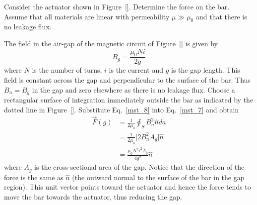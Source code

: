 \documentclass[12pt,a4paper,oneside]{book}
\begin{document}
\begin{onehalfspace}
\begin{example}
Consider the actuator shown in Figure~\ref{}. Determine the force on the bar. Assume that all materials are linear with permeability $\mu\gg\mu_0$ and that there is no leakage flux.

The field in the air-gap of the magnetic circuit of Figure~\ref{} is given by
\begin{equation}\label{mst_8}
	B_g=\frac{\mu_0Ni}{2g}
\end{equation}  
where $N$ is the number of turns, $i$ is the current and $g$ is the gap length. This field is constant across the gap and perpendicular to the surface of the bar. Thus $B_n=B_g$ in the gap and zero elsewhere as there is no leakage flux. Choose a rectangular surface of integration immediately outside the bar as indicated by the dotted line in Figure~\ref{}. Substitute Eq.~\eqref{mst_8} into Eq.~\eqref{mst_7} and obtain
\begin{equation}\label{mst_9}
	\begin{aligned}
	\vec{F}(g) &= \frac{1}{2\mu_0}\oint_{S}B_n^2\hat{n}da \\[6pt]
	&= \frac{1}{2\mu_0}\Big[2B_n^2A_g\Big]\hat{n} \\[6pt]
	&= \frac{\mu_0N^2i^2A_g}{4g^2}\hat{n}
\end{aligned}
\end{equation}  
where $A_g$ is the cross-sectional area of the gap. Notice that the direction of the force is the same as $\hat{n}$ (the outward normal to the surface of the bar in the gap region). This unit vector points toward the actuator and hence the force tends to move the bar towards the actuator, thus reducing the gap.
\end{example}


\end{onehalfspace}
\end{document}
